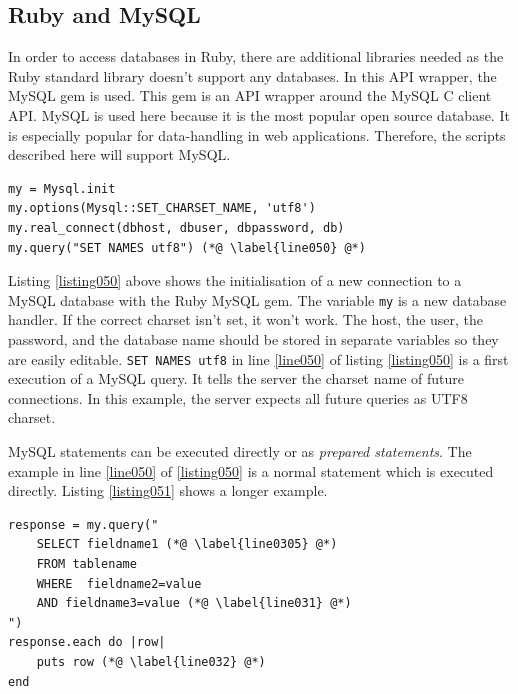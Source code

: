 \subsection{Ruby and MySQL}\label{rubymysql}
In order to access databases in Ruby, there are additional libraries needed as the Ruby standard library doesn't support any databases. In this API wrapper, the MySQL gem is used. This gem is an API wrapper around the MySQL C client API. MySQL is used here because it is the most popular open source database. \cite{mysql:popularity} It is especially popular for data-handling in web applications. Therefore, the scripts described here will support MySQL.

\begin{lstlisting}[aboveskip=1\baselineskip, caption=Initialising a database connection\index{database!connection}., label=listing050]
my = Mysql.init
my.options(Mysql::SET_CHARSET_NAME, 'utf8')
my.real_connect(dbhost, dbuser, dbpassword, db)
my.query("SET NAMES utf8") (*@ \label{line050} @*)	
\end{lstlisting}

Listing \ref{listing050} above shows the initialisation of a new connection to a MySQL database with the Ruby MySQL gem. The variable \lstinline{my} is a new database handler. If the correct charset isn't set, it won't work. The host, the user, the password, and the database name should be stored in separate variables so they are easily editable. \lstinline{SET NAMES utf8} in line \ref{line050} of listing \ref{listing050} is a first execution of a MySQL query. It tells the server the charset name of future connections. In this example, the server expects all future queries as UTF8  charset.

MySQL statements can be executed directly or as \emph{prepared statements}. The example in line \ref{line050} of  \ref{listing050} is a normal statement which is executed directly. Listing \ref{listing051} shows a longer example.

\begin{lstlisting}[aboveskip=1\baselineskip, caption=Example for a directly executed MySQL query., label=listing051]
response = my.query(" 
	SELECT fieldname1 (*@ \label{line0305} @*)
	FROM tablename 
	WHERE  fieldname2=value
	AND fieldname3=value (*@ \label{line031} @*)
")
response.each do |row|
	puts row (*@ \label{line032} @*)
end
\end{lstlisting}

